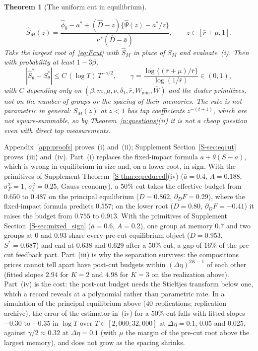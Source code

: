 \documentclass[11pt,letterpaper]{article}
\newtheorem{theorem}{Theorem}[section]
\theoremstyle{definition}
\begin{document}
\begin{theorem}[The uniform cut in equilibrium]
\begin{enumerate}
  \[
    \hat S_M(z) = \frac{\hat\phi_0 - a^* + (\hat D - z)\{\hat\Psi(z) - a^*/z\}}{\kappa^*(\hat D - \bar a)}, \qquad z \in [\bar r + \mu, 1].
  \]
  Take the largest root of~\eqref{eq:Fcut} with $\hat S_M$ in place of $S_M$ and evaluate~(i). Then with probability at least $1 - 3\beta$,
  \[
    |\hat S^*_\theta - S^*_\theta| \le C\, (\log T)\, T^{-\gamma/2}, \qquad \gamma = \frac{\log\{(\bar r + \mu)/\bar r\}}{\log(1/\bar r)} \in (0, 1),
  \]
  with $C$ depending only on $(\beta, m, \mu, \nu, \delta_1, \bar r, W_{\min}, \bar W)$ and the dealer primitives, not on the number of groups or the spacing of their memories. The rate is not parametric in general: $S_M(z)$ at $z < 1$ has tap coefficients $z^{-(t+1)}$, which are not square-summable, so by Theorem~\ref{n:questions}(ii) it is not a cheap question even with direct tap measurements.
\end{enumerate}
\end{theorem}

Appendix~\ref{app:proofs} proves~(i) and~(ii); Supplement Section~\ref{S-sec:eqcut} proves~(iii) and~(iv). Part~(i) replaces the fixed-impact formula $a + \theta(S - a)$, which is wrong in equilibrium in size and, on a lower root, in sign. With the primitives of Supplement Theorem~\ref{S-thm:eqreduced}(iv) ($\bar a = 0.4$, $A = 0.188$, $\sigma_F^2 = 1$, $\sigma_\xi^2 = 0.25$, Gauss economy), a $50\%$ cut takes the effective budget from $0.650$ to $0.487$ on the principal equilibrium ($D = 0.862$, $\partial_D F = 0.29$), where the fixed-impact formula predicts $0.557$; on the lower root ($D = 0.80$, $\partial_D F = -0.41$) it raises the budget from $0.755$ to $0.913$. With the primitives of Supplement Section~\ref{S-sec:mixed_sign} ($\bar a = 0.6$, $A = 0.2$), one group at memory $0.7$ and two groups at $0$ and $0.93$ share every pre-cut equilibrium object ($D = 0.953$, $S^* = 0.687$) and end at $0.638$ and $0.629$ after a $50\%$ cut, a gap of $16\%$ of the pre-cut feedback part. Part~(iii) is why the separation survives: the compositions prices cannot tell apart have post-cut budgets within $(\Delta\eta)^{2K-1}$ of each other (fitted slopes $2.94$ for $K = 2$ and $4.98$ for $K = 3$ on the realization above). Part~(iv) is the cost: the post-cut budget needs the Stieltjes transform below one, which a record reveals at a polynomial rather than parametric rate. In a simulation of the principal equilibrium above ($40$ replications; replication archive), the error of the estimator in~(iv) for a $50\%$ cut falls with fitted slopes $-0.30$ to $-0.35$ in $\log T$ over $T \in [2{,}000, 32{,}000]$ at $\Delta\eta = 0.1$, $0.05$ and $0.025$, against $\gamma/2 \approx 0.32$ at $\Delta\eta = 0.1$ (with $\mu$ the margin of the pre-cut root above the largest memory), and does not grow as the spacing shrinks.
\end{document}
